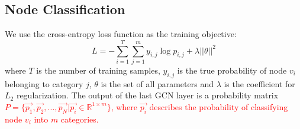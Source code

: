 \subsection{Node Classification}
We use the cross-entropy loss function as the training objective:
\begin{equation}
L=-\sum_{i=1}^T\sum_{j=1}^m y_{i,j}\log p_{i,j}+\lambda ||\theta||^2
\end{equation}
where $T$ is the number of training samples, $y_{i,j}$ is the true probability of node $v_i$ belonging to category $j$, $\theta$ is the set of all parameters and $\lambda$ is the coefficient for $L_2$  regularization. The output of the last GCN layer is a probability matrix \textcolor{red}{$P=\{\vec{p_1},\vec{p_2},...,\vec{p_N}|\vec{p_i}\in \mathbb{R}^{1 \times m}\}$, where $\vec{p_i}$ describes the probability of classifying node $v_i$ into $m$ categories.}
